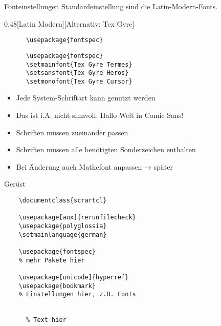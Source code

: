 \begin{frame}[fragile]{
  Fonteinstellungen
  \hfill
}
  Standardeinstellung sind die Latin-Modern-Fonts.
  \vspace{1em}
  \begin{CodeExplanation}{0.48}[Latin Modern][Alternativ: Tex Gyre]
    \begin{lstlisting}
      \usepackage{fontspec}
    \end{lstlisting}
  \Explanation
    \begin{lstlisting}
      \usepackage{fontspec}
      \setmainfont{Tex Gyre Termes}
      \setsansfont{Tex Gyre Heros}
      \setmonofont{Tex Gyre Cursor}
    \end{lstlisting}
  \end{CodeExplanation}
  \begin{itemize}
    \item Jede System-Schriftart kann genutzt werden
    \item \alert{Das ist i.A. nicht sinnvoll:  Hallo Welt in Comic Sans!}
    \item Schriften müssen zueinander passen
    \item Schriften müssen alle benötigten Sonderzeichen enthalten
    \item Bei Änderung auch Mathefont anpassen → später
  \end{itemize}
\end{frame}

\begin{frame}[fragile]{Gerüst}
  \begin{lstlisting}
    \documentclass{scrartcl}

    \usepackage[aux]{rerunfilecheck}
    \usepackage{polyglossia}
    \setmainlanguage{german}

    \usepackage{fontspec}
    % mehr Pakete hier

    \usepackage[unicode]{hyperref}
    \usepackage{bookmark}
    % Einstellungen hier, z.B. Fonts

    
      % Text hier
    
  \end{lstlisting}
\end{frame}

